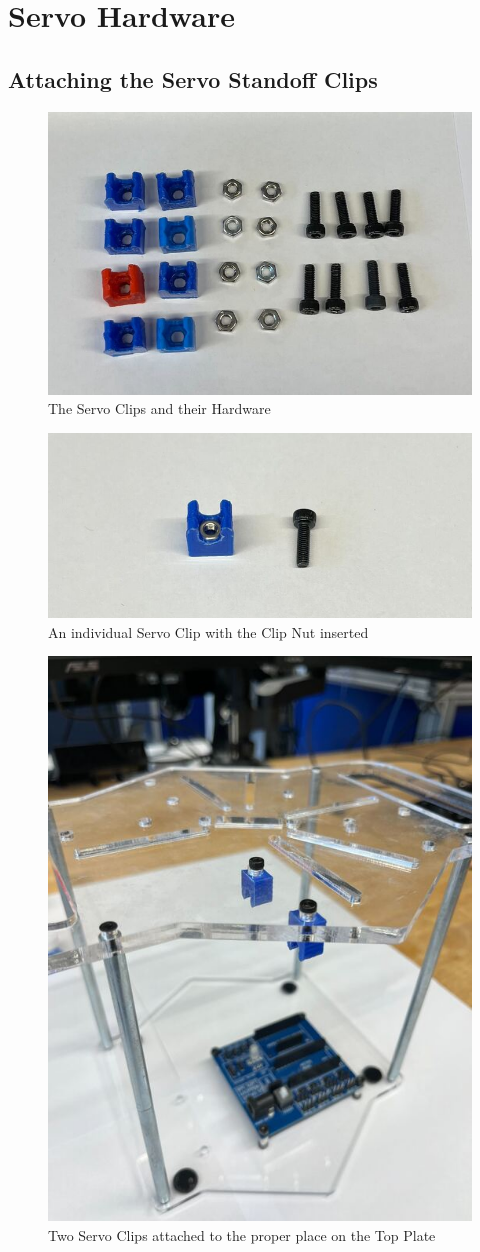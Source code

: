 \documentclass{article}
\begin{document}
\section{Servo Hardware}

\subsection{Attaching the Servo Standoff Clips}
\begin{figure}[H]
    \centering
    \includegraphics[width=0.5\linewidth]{PCBImages/StandoffClips/standoff_clips_1.jpg}
    \caption{The Servo Clips and their Hardware}
    \label{fig:servo_clips_hardware}
\end{figure}
\begin{figure}[H]
    \centering
    \includegraphics[width=0.5\linewidth]{PCBImages/StandoffClips/standoff_clips_3.jpg}
    \caption{An individual Servo Clip with the Clip Nut inserted}
    \label{fig:servo_clip_with_nut}
\end{figure}
\begin{figure}[H]
    \centering
    \includegraphics[width=0.5\linewidth]{PCBImages/StandoffClips/standoff_clips_6.jpg}
    \caption{Two Servo Clips attached to the proper place on the Top Plate}
    \label{fig:servo_clips_on_top_plate}
\end{figure}
\end{document}
